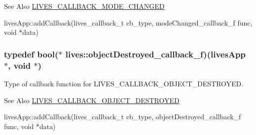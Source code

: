 \begin{DoxySeeAlso}{See Also}
\hyperlink{liblives_8hpp_a61f9a031360f0a0280151f44695c2519add31b9d6425736ea9dab6c057327ad48}{L\-I\-V\-E\-S\-\_\-\-C\-A\-L\-L\-B\-A\-C\-K\-\_\-\-M\-O\-D\-E\-\_\-\-C\-H\-A\-N\-G\-E\-D} 

lives\-App\-::add\-Callback(lives\-\_\-callback\-\_\-t cb\-\_\-type, mode\-Changed\-\_\-callback\-\_\-f func, void $\ast$data) 
\end{DoxySeeAlso}
\hypertarget{namespacelives_af2316179e783c96b4c146713929726f7}{
\subsubsection[{object\-Destroyed\-\_\-callback\-\_\-f}]{\setlength{\rightskip}{0pt plus 5cm}typedef bool($\ast$ lives\-::object\-Destroyed\-\_\-callback\-\_\-f)({\bf lives\-App} $\ast$, void $\ast$)}}\label{namespacelives_af2316179e783c96b4c146713929726f7}


Type of callback function for L\-I\-V\-E\-S\-\_\-\-C\-A\-L\-L\-B\-A\-C\-K\-\_\-\-O\-B\-J\-E\-C\-T\-\_\-\-D\-E\-S\-T\-R\-O\-Y\-E\-D. 

\begin{DoxySeeAlso}{See Also}
\hyperlink{liblives_8hpp_a61f9a031360f0a0280151f44695c2519ae341e96064358748bb98867aeb8a9c5c}{L\-I\-V\-E\-S\-\_\-\-C\-A\-L\-L\-B\-A\-C\-K\-\_\-\-O\-B\-J\-E\-C\-T\-\_\-\-D\-E\-S\-T\-R\-O\-Y\-E\-D} 

lives\-App\-::add\-Callback(lives\-\_\-callback\-\_\-t cb\-\_\-type, object\-Destroyed\-\_\-callback\-\_\-f func, void $\ast$data) 
\end{DoxySeeAlso}
